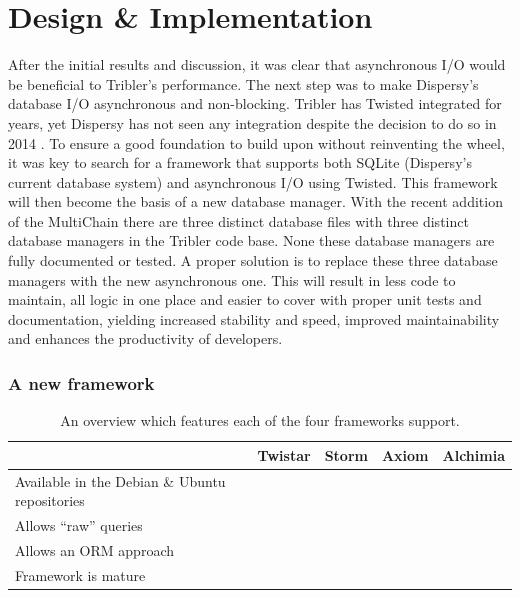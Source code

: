 \chapter{Design \& Implementation}

After the initial results and discussion, it was clear that asynchronous I/O would be beneficial to Tribler's performance.
The next step was to make Dispersy's database I/O asynchronous and non-blocking.
Tribler has Twisted integrated for years, yet Dispersy has not seen any integration despite the decision to do so in 2014 \cite{pouwelse2013consider}.
To ensure a good foundation to build upon without reinventing the wheel, it was key to search for a framework that supports both SQLite (Dispersy's current database system) and asynchronous I/O using Twisted.
This framework will then become the basis of a new database manager.
With the recent addition of the MultiChain there are three distinct database files with three distinct database managers in the Tribler code base.
None these database managers are fully documented or tested.
A proper solution is to replace these three database managers with the new asynchronous one.
This will result in less code to maintain, all logic in one place and easier to cover with proper unit tests and documentation, yielding increased stability and speed, improved maintainability and enhances the productivity of developers.

\subsection{A new framework}

\begin{table}[]
	\centering
	\caption{An overview which features each of the four frameworks support.}
	\label{table:database_frameworks_comparison}
	\begin{tabular}{l|c|c|c|c|}
		\cline{2-5}
		& \textbf{Twistar} & \textbf{Storm} & \textbf{Axiom} & \textbf{Alchimia} \\ \hline
	\multicolumn{1}{|p{4cm}|}{Available in the Debian \& Ubuntu repositories} 	& \xmark & \cmark & \cmark & \xmark \\ \hline
	\multicolumn{1}{|l|}{Allows \enquote{raw} queries} 							& \cmark & \cmark & \cmark & \cmark \\ \hline
	\multicolumn{1}{|l|}{Allows an ORM approach} 								& \cmark & \cmark & \cmark & \xmark \\ \hline
	\multicolumn{1}{|l|}{Framework is mature} 									& \cmark & \cmark & \cmark & \xmark \\ \hline
	\end{tabular}
\end{table}


